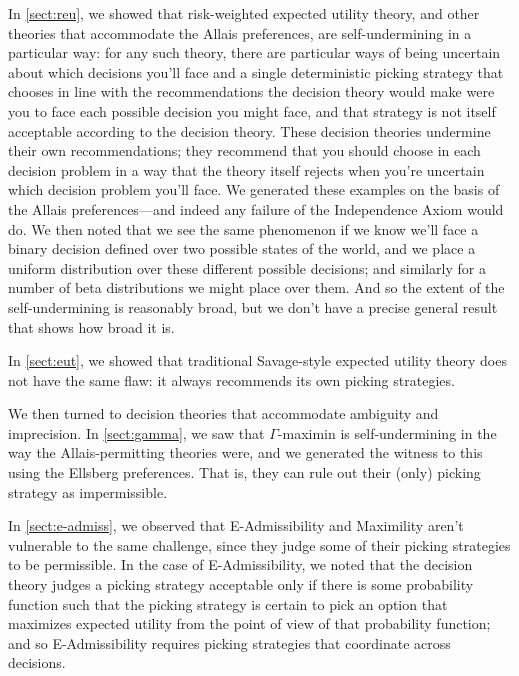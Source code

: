 \documentclass[a4paper,final]{article}
\renewcommand\P{\mathbb{P}} %
\newcommand\EU{\mathrm{EU}}
\newcommand{\IP}{\P}
\newcommand{\todoold}[2][]{\todo[backgroundcolor=white,bordercolor=orange!10,linecolor=gray!10, #1,caption={},textcolor=gray]{Pre-rev: #2}}
\newenvironment{CCM rewritten}
{\begingroup\color{blue}} %
{\endgroup}              %
\begin{document}
In \cref{sect:reu}, we showed that risk-weighted expected utility theory, and other theories that accommodate the Allais preferences, are self-undermining in a particular way: for any such theory, there are particular ways of being uncertain about which decisions you'll face and a single deterministic picking strategy that chooses in line with the recommendations the decision theory would make were you to face each possible decision you might face, and that strategy is not itself acceptable according to the decision theory. These decision theories undermine their own recommendations; they recommend that you should choose in each decision problem in a way that the theory itself rejects when you're uncertain which decision problem you'll face. We generated these examples on the basis of the Allais preferences---and indeed any failure of the Independence Axiom would do. We then noted that we see the same phenomenon if we know we'll face a binary decision defined over two possible states of the world, and we place a uniform distribution over these different possible decisions; and similarly for a number of beta distributions we might place over them. And so the extent of the self-undermining is reasonably broad, but we don't have a precise general result that shows how broad it is.

In \cref{sect:eut}, we showed that traditional Savage-style expected utility theory does not have the same flaw: it always recommends its own picking strategies.

We then turned to decision theories that accommodate ambiguity and imprecision. In \cref{sect:gamma}, we saw that $\Gamma$-maximin is self-undermining in the way the Allais-permitting theories were, and we generated the witness to this using the Ellsberg preferences.\todoold{are we going to say something about} That is, they can rule out their (only) picking strategy as impermissible. 

In \cref{sect:e-admiss}, we observed that E-Admissibility and Maximility aren't vulnerable to the same challenge, since they judge some of their picking strategies to be permissible. In the case of E-Admissibility, we noted that the decision theory judges a picking strategy acceptable only if there is some probability function such that the picking strategy is certain to pick an option that maximizes expected utility from the point of view of that probability function; and so E-Admissibility requires picking strategies that coordinate across decisions.

\end{document}
